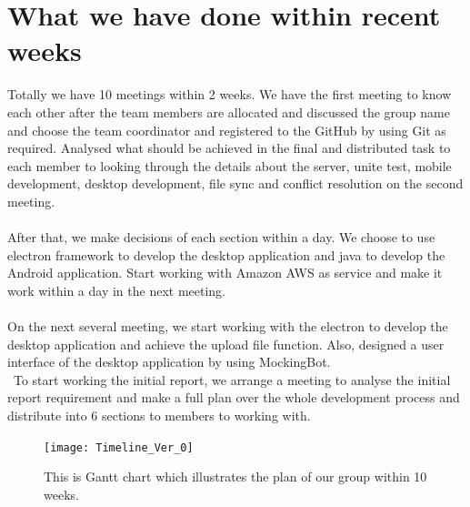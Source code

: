\documentclass[a4paper]{article}
\begin{document}
{\section{What we have done within recent weeks}
Totally we have 10 meetings within 2 weeks. We have the first meeting to know each other after the team members are allocated and discussed the group name and choose the team coordinator and registered to the GitHub by using Git as required. Analysed what should be achieved in the final and distributed task to each member to looking through the details about the server, unite test, mobile development, desktop development, file sync and conflict resolution on the second meeting. \\\\
After that, we make decisions of each section within a day. We choose to use electron framework to develop the desktop application and java to develop the Android application. Start working with Amazon AWS as service and make it work within a day in the next meeting. \\\\
On the next several meeting, we start working with the electron to develop the desktop application and achieve the upload file function. Also, designed a user interface of the desktop application by using MockingBot. \\\
To start working the initial report, we arrange a meeting to analyse the initial report requirement and make a full plan over the whole development process and distribute into 6 sections to members to working with.


\begin{figure}
\texttt{[image: Timeline\_Ver\_0]}
\caption{This is Gantt chart which illustrates the plan of our group within 10 weeks.}
\end{figure}
}
\end{document}
